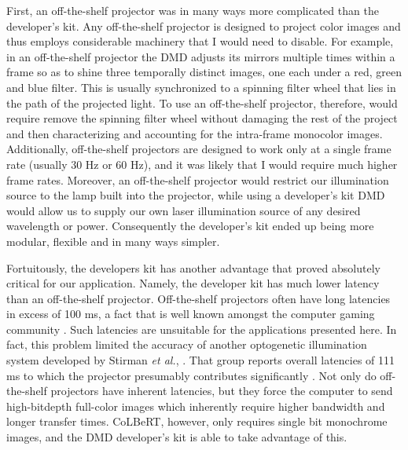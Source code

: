 First, an off-the-shelf projector was in many ways more complicated than the developer's kit. Any off-the-shelf projector is designed to project color images and thus employs considerable machinery that I would need to disable. For example, in an off-the-shelf projector the DMD adjusts its mirrors multiple times within a frame so as to shine three temporally distinct images, one each under a red, green and blue filter. This is usually synchronized to a spinning filter wheel that lies in the path of the projected light. To use an off-the-shelf projector, therefore, would require remove the spinning filter wheel without damaging the rest of the project and then characterizing and accounting for the intra-frame monocolor images. Additionally, off-the-shelf projectors are designed to work only at a single frame rate (usually 30 Hz or 60 Hz), and it was likely that I would require much higher frame rates.  Moreover, an off-the-shelf projector would restrict our illumination source to the lamp built into the projector, while using a developer's kit DMD would allow us to supply our own laser illumination source of any desired wavelength or power. Consequently the developer's kit ended up being more modular, flexible and in many ways simpler. 

Fortuitously, the developers kit has another advantage that proved absolutely critical for our application. Namely, the developer kit has much lower latency than an off-the-shelf projector.  Off-the-shelf projectors often have long latencies in excess of 100 ms, a fact that is well known amongst the computer gaming community \citep{livolsi_projectors_2008}. Such latencies are unsuitable for the applications presented here. In fact, this  problem  limited the accuracy of another optogenetic illumination system developed by Stirman \textit{et al.}, \citep{stirman_real-time_2011}. That group reports overall latencies of 111 ms to which the projector presumably contributes significantly \citep{stirman_multispectral_2012}.  Not only do off-the-shelf projectors have inherent latencies, but they force the computer to send  high-bitdepth full-color images which inherently require higher bandwidth and longer transfer times. CoLBeRT, however, only requires single bit monochrome images, and the DMD developer's kit is able to take advantage of this. 

